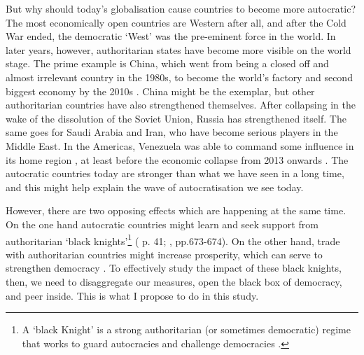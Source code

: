 But why should today's globalisation cause countries to become more autocratic? The most economically open countries are Western after all, and after the Cold War ended, the democratic `West' was the pre-eminent force in the world. In later years, however, authoritarian states have become more visible on the world stage. The prime example is China, which went from being a closed off and almost irrelevant country in the 1980s, to become the world's factory and second biggest economy by the 2010s \citep{imf_world_2025}. China might be the exemplar, but other authoritarian countries have also strengthened themselves. After collapsing in the wake of the dissolution of the Soviet Union, Russia has strengthened itself. The same goes for Saudi Arabia and Iran, who have become serious players in the Middle East. In the Americas, Venezuela was able to command some influence in its home region \citep[p. 204]{mcconnell_elite_2024}, at least before the economic collapse from 2013 onwards \citep{imf_world_2025}. The autocratic countries today are stronger than what we have seen in a long time, and this might help explain the wave of autocratisation we see today.

However, there are two opposing effects which are happening at the same time. On the one hand autocratic countries might learn and seek support from authoritarian `black knights'\footnote{A `black Knight' is a strong authoritarian (or sometimes democratic) regime that works to guard autocracies and challenge democracies \cite[p. 676]{tolstrup_black_2014}.} (\citeauthor{levitsky_competitive_2010} \citeyear{levitsky_competitive_2010} p. 41; \citeauthor{tolstrup_black_2014} \citeyear{tolstrup_black_2014}, pp.673-674). On the other hand, trade with authoritarian countries might increase prosperity, which can serve to strengthen democracy \citep{lipset_social_1959, przeworski_modernization_1997}. To effectively study the impact of these black knights, then, we need to disaggregate our measures, open the black box of democracy, and peer inside. This is what I propose to do in this study.

